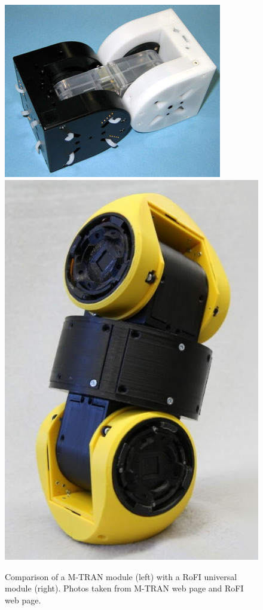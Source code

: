 \documentclass[
  digital, %
  table,   %
  oneside, %
  nolof,     %
  nolot,     %
]{fithesis3}
\begin{document}
\begin{figure}
    \centering
    \includegraphics[height=.3\textheight]{data/mtran3.jpg}
    \includegraphics[height=.4\textheight]{data/rofi_universal_module.jpg}
    \caption{Comparison of a M-TRAN module (left) with a RoFI universal module (right). Photos taken from M-TRAN web page\cite{mtran-web} and RoFI web page\cite{rofi-web}.}
    \label{fig:mtran-rofi}
\end{figure}
\end{document}
